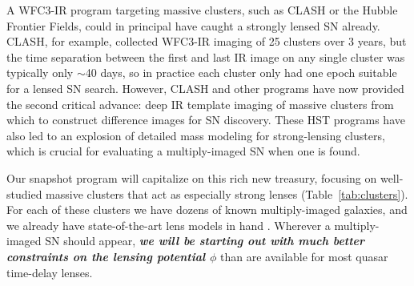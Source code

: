A WFC3-IR program targeting massive clusters, such as CLASH or the
Hubble Frontier Fields, could in principal have caught a strongly
lensed SN already.  CLASH, for example, collected
WFC3-IR imaging of 25 clusters over 3 years, but the time separation
between the first and last IR image on any single cluster was
typically only $\sim$40 days, so in practice each cluster only had one
epoch suitable for a lensed SN search. 
However, CLASH and other programs have now provided the second critical
advance: deep IR template imaging of massive clusters from which to
construct difference images for SN discovery.  These HST programs have
also led to an explosion of detailed mass modeling for strong-lensing
clusters, %
which is crucial for evaluating a multiply-imaged SN when one is found.

Our snapshot program will capitalize on this rich new treasury,
focusing on well-studied massive clusters
that act as especially strong lenses (Table~\ref{tab:clusters}). For
each of these clusters we have dozens of known multiply-imaged
galaxies, and we already have state-of-the-art lens models in
hand \citep[e.g.][]{Zitrin:2011a,Zitrin:2011b,Zitrin:2012a,Zitrin:2012b,Zitrin:2013}.
Wherever a multiply-imaged SN should appear, {\bf \em we will be
starting out with much better constraints on the lensing potential
$\phi$} than are available for most quasar time-delay lenses. 

